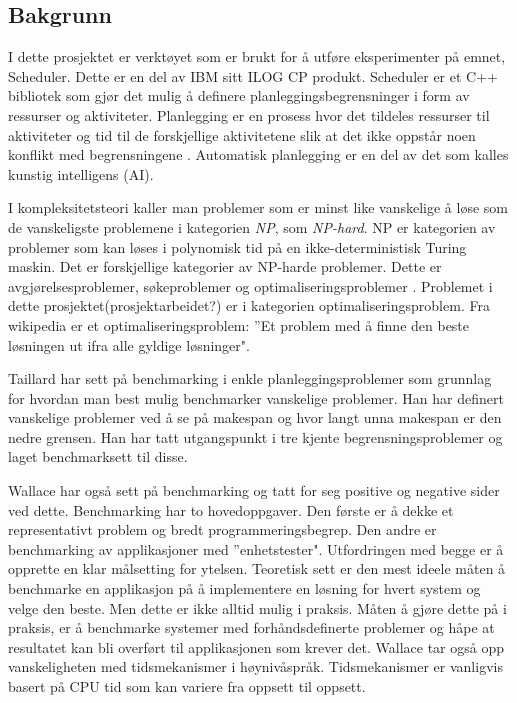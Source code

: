 \subsection{Bakgrunn}
I dette prosjektet er verktøyet som er brukt for å utføre eksperimenter på emnet, Scheduler. Dette er en del av IBM sitt ILOG CP produkt. Scheduler er et C++ bibliotek som gjør det mulig å definere planleggingsbegrensninger i form av ressurser og aktiviteter. Planlegging er en prosess hvor det tildeles ressurser til aktiviteter og tid til de forskjellige aktivitetene slik at det ikke oppstår noen konflikt med begrensningene \cite{Pape94implementationof}. Automatisk planlegging er en del av det som kalles kunstig intelligens (AI).

I kompleksitetsteori \cite{compcomplextheory} kaller man problemer som er minst like vanskelige å løse som de vanskeligste problemene i kategorien \textit{NP}, som \textit{NP-hard}. NP er kategorien av problemer som kan løses i polynomisk tid på en ikke-deterministisk Turing maskin. Det er forskjellige kategorier av NP-harde problemer. Dette er avgjørelsesproblemer, søkeproblemer og optimaliseringsproblemer \cite{nphardwikipedia}. Problemet i dette prosjektet(prosjektarbeidet?) er i kategorien optimaliseringsproblem. Fra wikipedia \cite{optimizationproblemwiki} er et optimaliseringsproblem: ''Et problem med å finne den beste løsningen ut ifra alle gyldige løsninger".

Taillard \cite{Taillard1993278} har sett på benchmarking i enkle planleggingsproblemer som grunnlag for hvordan man best mulig benchmarker vanskelige problemer. Han har definert vanskelige problemer ved å se på makespan og hvor langt unna makespan er den nedre grensen. Han har tatt utgangspunkt i tre kjente begrensningsproblemer og laget benchmarksett til disse.

Wallace \cite{Wallace:2004:BCL:956860.956861} har også sett på benchmarking og tatt for seg positive og negative sider ved dette. Benchmarking har to hovedoppgaver. Den første er å dekke et representativt problem og bredt programmeringsbegrep. Den andre er benchmarking av applikasjoner med ''enhetstester". Utfordringen med begge er å opprette en klar målsetting for ytelsen. Teoretisk sett er den mest ideele måten å benchmarke en applikasjon på å implementere en løsning for hvert system og velge den beste. Men dette er ikke alltid mulig i praksis. Måten å gjøre dette på i praksis, er å benchmarke systemer med forhåndsdefinerte problemer og håpe at resultatet kan bli overført til applikasjonen som krever det. Wallace tar også opp vanskeligheten med tidsmekanismer i høynivåspråk. Tidsmekanismer er vanligvis basert på CPU tid som kan variere fra oppsett til oppsett.